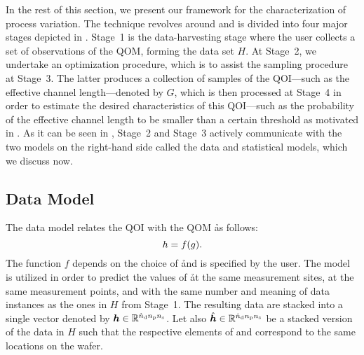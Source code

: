 In the rest of this section, we present our framework for the characterization
of process variation. The technique revolves around  and is
divided into four major stages depicted in . Stage~1 is
the data-harvesting stage where the user collects a set of observations of the
\ac{QOM}, forming the data set $H$. At Stage~2, we undertake an optimization
procedure, which is to assist the sampling procedure at Stage~3. The latter
produces a collection of samples of the \ac{QOI}---such as the effective channel
length---denoted by $G$, which is then processed at Stage~4 in order to estimate
the desired characteristics of this \ac{QOI}---such as the probability of the
effective channel length to be smaller than a certain threshold as motivated in
. As it can be seen in ,
Stage~2 and Stage~3 actively communicate with the two models on the right-hand
side called the data and statistical models, which we discuss now.

\subsection{Data Model}

The data model relates the \ac{QOI} \g with the \ac{QOM} \h as follows:
\[
  h = f(g).
\]
The function $f$ depends on the choice of \h and is specified by the user. The
model is utilized in order to predict the values of \h at the same measurement
sites, at the same measurement points, and with the same number and meaning of
data instances as the ones in $H$ from Stage~1. The resulting data are stacked
into a single vector denoted by $\boldsymbol{h} \in \mathbb{R}^{{\hat{n}_\mathrm{d}} {n_\mathrm{p}} {n_\mathrm{s}}}$. Let also $\hat{\boldsymbol{h}}
\in \mathbb{R}^{{\hat{n}_\mathrm{d}} {n_\mathrm{p}} {n_\mathrm{s}}}$ be a stacked version of the data in $H$ such that the
respective elements of \vh and \hvh correspond to the same locations on the
wafer.

